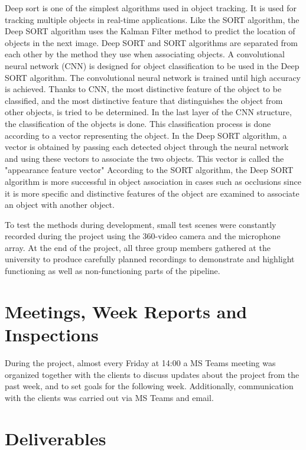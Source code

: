 Deep sort is one of the simplest algorithms used in object tracking. It is used for tracking multiple objects in real-time applications. Like the SORT algorithm, the Deep SORT algorithm uses the Kalman Filter method to predict the location of objects in the next image. Deep SORT and SORT algorithms are separated from each other by the method they use when associating objects. A convolutional neural network (CNN) is designed for object classification to be used in the Deep SORT algorithm. The convolutional neural network is trained until high accuracy is achieved. Thanks to CNN, the most distinctive feature of the object to be classified, and the most distinctive feature that distinguishes the object from other objects, is tried to be determined. In the last layer of the CNN structure, the classification of the objects is done. This classification process is done according to a vector representing the object. In the Deep SORT algorithm, a vector is obtained by passing each detected object through the neural network and using these vectors to associate the two objects. This vector is called the "appearance feature vector" According to the SORT algorithm, the Deep SORT algorithm is more successful in object association in cases such as occlusions since it is more specific and distinctive features of the object are examined to associate an object with another object.

To test the methods during development, small test scenes were constantly recorded during the project using the 360-video camera and the microphone array. At the end of the project, all three group members gathered at the university to produce carefully planned recordings to demonstrate and highlight functioning as well as non-functioning parts of the pipeline.



\section{Meetings, Week Reports and Inspections}

During the project, almost every Friday at 14:00 a MS Teams meeting was organized together with the clients to discuss updates about the project from the past week, and to set goals for the following week. Additionally, communication with the clients was carried out via MS Teams and email.

\section{Deliverables}

